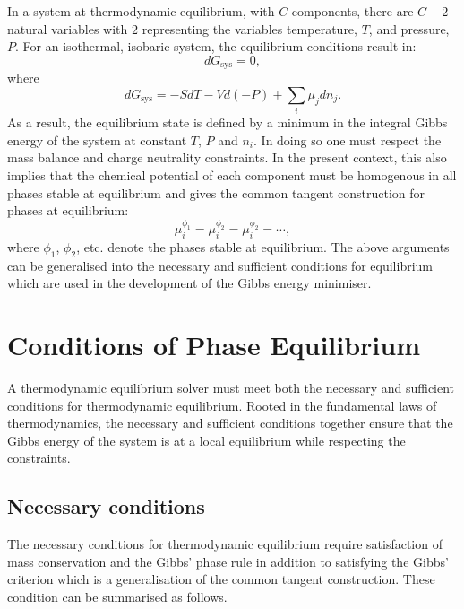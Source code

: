     In a system at thermodynamic equilibrium, with $C$ components, there are $C+2$ natural variables with $2$ representing the variables temperature, $T$, and pressure, $P$. For an isothermal, isobaric system, the equilibrium conditions result in:
    \begin{equation}
        d G_{\text{sys}} = 0,
    \end{equation}
    where
    \begin{equation}
        d G_{\text{sys}} = -S dT -Vd(-P) + \sum_{i} \mu_j d n_j.
    \end{equation}
    As a result, the equilibrium state is defined by a minimum in the integral Gibbs energy of the system at constant $T$, $P$ and $n_i$. In doing so one must respect the mass balance and charge neutrality constraints. In the present context, this also implies that the chemical potential of each component must be homogenous in all phases stable at equilibrium and gives the common tangent construction for phases at equilibrium:
    \begin{equation}
        \mu_{i}^{\phi_1} = \mu_{i}^{\phi_2} = \mu_{i}^{\phi_2} = \cdots,
    \end{equation}
    where $\phi_1$, $\phi_2$, etc. denote the phases stable at equilibrium. The above arguments can be generalised into the necessary and sufficient conditions for equilibrium which are used in the development of the Gibbs energy minimiser. 

\section{Conditions of Phase Equilibrium} \label{sec:eqb_theory}
A thermodynamic equilibrium solver must meet both the necessary and sufficient conditions for thermodynamic equilibrium. Rooted in the fundamental laws of thermodynamics, the necessary and sufficient conditions together ensure that the Gibbs energy of the system is at a local equilibrium while respecting the constraints.

\subsection{Necessary conditions}
	The necessary conditions for thermodynamic equilibrium require satisfaction of mass conservation and the Gibbs' phase rule in addition to satisfying the Gibbs' criterion which is a generalisation of the common tangent construction. These condition can be summarised as follows.
	
